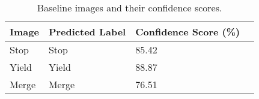 \begin{table}[t]
\centering
\caption{Baseline images and their confidence scores.}
\label{table_adversarial}
\small
\begin{tabular}{|p{1.8cm}|p{1.8cm}|p{1.8cm}|p{1.2cm}|}
\hline 
\textbf{Image} & \textbf{Predicted Label}  & \textbf{Confidence Score (\%)}
\\ \hline \hline
Stop &  Stop &  85.42 \\ \hline 
Yield  & Yield & 88.87 \\ \hline 
Merge & Merge & 76.51 \\ \hline 

\end{tabular}
\end{table}


